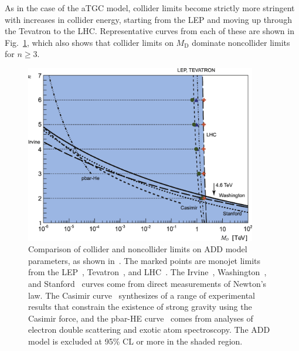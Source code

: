 \documentclass[oneside, letterpaper, 12pt, oldfontcommands]{memoir}
\begin{document}
As in the case of the aTGC model, collider limits
become strictly more stringent with increases in collider energy, starting from the LEP and moving up through the Tevatron to the LHC.
Representative curves from each of these are shown in Fig.~\ref{fig:add_noncollider_comparison}, which also shows that collider limits
on $M_\mathrm{D}$ dominate noncollider limits for $n \geq 3$.

\begin{figure}[hbtp]
  \begin{center}
    \includegraphics[width=0.90\textwidth]{Figures/add_noncollider_comparison_jpeg.jpg}
    \caption{
      Comparison of collider and noncollider limits on ADD model parameters, as shown in~\cite{ref:0264-9381/32/3/033001}.
      The marked points are monojet limits from the LEP~\cite{ref:9789812702227_0266}, Tevatron~\cite{ref:PhysRevLett.101.181602}, and LHC~\cite{ref:j.physletb.2011.10.006, ref:PhysRevLett.110.011802, ref:0264-9381/32/3/033001}.
      The Irvine~\cite{ref:PhysRevD.32.3084, ref:PhysRevLett.44.1645}, Washington~\cite{ref:PhysRevLett.98.021101}, and Stanford~\cite{ref:PhysRevD.78.022002} curves come from direct measurements of Newton's law.
      The Casimir curve~\cite{ref:0264-9381/32/3/033001} synthesizes of a range of  experimental results that constrain the existence of strong gravity using the Casimir force,
      and the pbar-HE curve~\cite{ref:epjconf/20146605021, ref:0264-9381/32/3/033001} comes from analyses of electron double scattering and exotic atom spectroscopy.
      The ADD model is excluded at 95\% CL or more in the shaded region.
    }
    \label{fig:add_noncollider_comparison}
  \end{center}
\end{figure}
\end{document}
